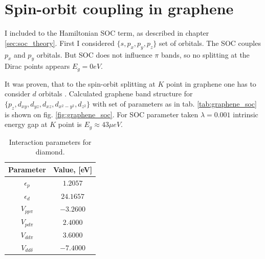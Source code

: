 \section{Spin-orbit coupling in graphene}
I included to the Hamiltonian SOC term, as described in chapter \ref{sec:soc_theory}. First I considered $\{ s, p_x, p_y, p_z \}$ set of orbitals. The SOC couples $p_x$ and $p_y$ orbitals. But SOC does not influence $\pi$ bands, so no splitting at the Dirac points appears $E_g = 0 eV$.

It was proven, that to the spin-orbit splitting at $K$ point in graphene one has to consider $d$
orbitals \cite{slonczewski}. Calculated graphene band structure for $\{p_z, d_{xy}, d_{yz}, d_{xz}, d_{x^2 - y^2}, d_{z^2} \}$ with set of parameters as in tab. \ref{tab:graphene_soc} is shown on fig. \ref{fig:graphene_soc}. For SOC parameter taken $\lambda=0.001$ intrinsic energy gap at $K$ point is $E_g \approx 43 \mu eV$.
\begin{table}[h]
 \begin{center}
  \begin{tabular}{|c|c|}
  \hline
    Parameter&Value, [eV]\\ \hline
    $\epsilon_p$ & $1.2057$ \\ \hline
    $\epsilon_d$ & $24.1657$ \\ \hline
    $V_{pp \pi}$ & $-3.2600$  \\ \hline
    $V_{pd \pi}$ & $2.4000$\\ \hline
    $V_{dd \pi}$ & $3.6000$ \\ \hline
    $V_{dd \delta}$ &  $-7.4000$\\ \hline
  \end{tabular}
 \end{center}
  \caption{Interaction parameters for diamond. \cite{graphene_soc_parameters}}
\end{table}
